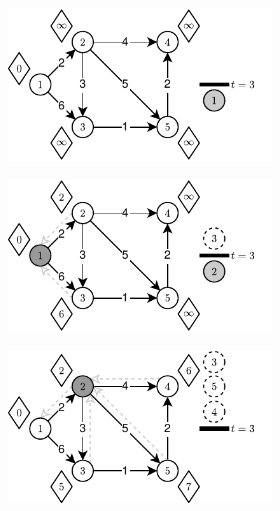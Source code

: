 \begin{figure}[!ht]
	\begin{subfigure}[b]{\textwidth}
		\null\hfill
		\begin{subfigure}[b]{0.32\textwidth}
			\includegraphics[width=\textwidth]{Chapter_III/THRESHOLD-Example/a.pdf}
			\caption{}
			\label{fig:exampleThreshold:a}
		\end{subfigure}
		\hfill
		\begin{subfigure}[b]{0.32\textwidth}
			\includegraphics[width=\textwidth]{Chapter_III/THRESHOLD-Example/b.pdf}
			\caption{}
			\label{fig:exampleThreshold:b}
		\end{subfigure}
		\hfill
		\begin{subfigure}[b]{0.32\textwidth}
			\includegraphics[width=\textwidth]{Chapter_III/THRESHOLD-Example/c.pdf}

\end{subfigure}
\end{subfigure}
\end{figure}
